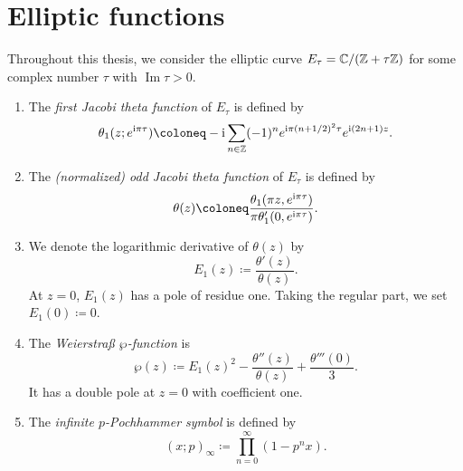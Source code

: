 
\chapter{Elliptic functions}\label{app:ellipticFuncs}

Throughout this thesis, we consider the elliptic curve $E_\tau = \mathbb{C}/(\mathbb{Z} + \tau \mathbb{Z})$ for some complex number $\tau$ with $\operatorname{Im} \tau > 0$.

\begin{definition}
\begin{enumerate}[label=(\roman*)]
	\item The \emph{first Jacobi theta function} of $E_\tau$ is defined by
	\begin{equation}
		\theta_1(z;e^{\I\pi\tau}) \coloneq -\I \sum_{n \in \Z} (-1)^n e^{\I\pi(n+1/2)^2\tau} e^{\I(2n+1)z}.
	\end{equation}
	\item The \emph{(normalized) odd Jacobi theta function} of $E_\tau$ is defined by
	\begin{equation}\label{eq:oddTheta}
	    \theta(z) \coloneq \frac{\theta_1(\pi z,e^{\I \pi \tau})}{\pi \theta_1'(0,e^{\I \pi \tau})}.
	\end{equation}
	\item We denote the logarithmic derivative of $\theta(z)$ by
	\begin{equation}
    	E_1(z) \coloneq \frac{\theta'(z)}{\theta(z)}.
	\end{equation}
	At $z=0$, $E_1(z)$ has a pole of residue one. Taking the regular part, we set $E_1(0) \coloneq 0$.
	\item The \emph{Weierstraß $\wp$-function} is
	\begin{equation}
		\wp(z) \coloneq E_1(z)^2 - \frac{\theta''(z)}{\theta(z)} + \frac{\theta'''(0)}{3}.
	\end{equation}
	It has a double pole at $z=0$ with coefficient one.
	\item The \emph{infinite $p$-Pochhammer symbol} is defined by
	\begin{equation}
		(x;p)_\infty \coloneq \prod_{n=0}^\infty (1-p^n x).
	\end{equation}
\end{enumerate}
\end{definition}

